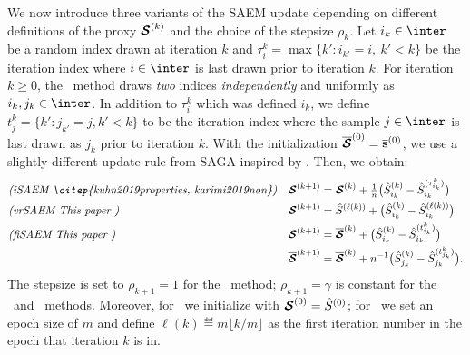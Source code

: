 \documentclass[11pt]{article}
\theoremstyle{t}
\begin{document}
We now introduce three variants of the SAEM update depending on different definitions of the proxy ${\bm{\mathcal{S}}}^{(k)}$ and the choice of the stepsize $\rho_k$.
Let $i_k \in \inter$ be a random index drawn at iteration $k$ and $\tau_i^k = \max \{ k' : i_{k'} = i,~k' < k \}$ be the iteration index where $i \in \inter$ is last drawn prior to iteration $k$.
For iteration $k \geq 0$, the \FISAEM\ method draws \emph{two} indices \emph{independently} and uniformly as $i_k, j_k \in \inter$. In addition to $\tau_i^k$ which was defined \wrt $i_k$, we define $t_j^k = \{ k' : j_{k'} = j , k' < k \}$ to be the iteration index where the sample $j \in \inter$ is last drawn as $j_k$ prior to iteration $k$. With the initialization $\overline{{\bm{\mathcal{S}}}}^{(0)} = \overline{{\mathbf{s}}}^{(0)}$, we use a slightly different update rule from SAGA inspired by \citep{reddi2016fast}. Then, we obtain:
\begin{align}
&\emph{(\ISAEM\ \citep{kuhn2019properties, karimi2019non})} & \StocEstep^{(k+1)} &= \StocEstep^{(k)} + {\textstyle \frac{1}{n}}\big( \hat{S}_{i_k}^{(k)}  - \hat{S}_{i_k}^{(\tau_{i_k}^k)} \big) \label{eq:isaem} \\
&\emph{(\SAEMVR\ This paper )} &\StocEstep^{(k+1)} &= \hat{S}^{(\ell(k))} +  \big( \hat{S}_{i_k}^{(k)}  -\hat{S}_{i_k}^{(\ell(k))}   \big) \label{eq:vrsaem}\\
&\emph{(\FISAEM\ This paper )} &\StocEstep^{(k+1)} &= \overline{\StocEstep}^{(k)} + \big( \hat{S}_{i_k}^{(k)}  - \hat{S}_{i_k}^{(t_{i_k}^k)} \big) \label{eq:fisaem}\\
&    &\overline{\StocEstep}^{(k+1)} &= \overline{\StocEstep}^{(k)} + n^{-1} \big( \hat{S}_{j_k}^{(k)}  - \hat{S}_{j_k}^{(t_{j_k}^k)} \big).
\end{align}
The stepsize is set to $\rho_{k+1} = 1$ for the \ISAEM\ method; $\rho_{k+1} = \gamma$ is  constant for the \SAEMVR\ and \FISAEM\ methods.
Moreover, for \ISAEM\ we initialize with ${\bm{\mathcal{S}}}^{(0)} = \hat{S}^{(0)}$; for \SAEMVR\, we set an epoch size of $m$ and define $\ell(k) \eqdef m \lfloor k/m \rfloor$ as the first iteration number in the epoch that iteration $k$ is in. \vspace{-.2cm}
\end{document}

